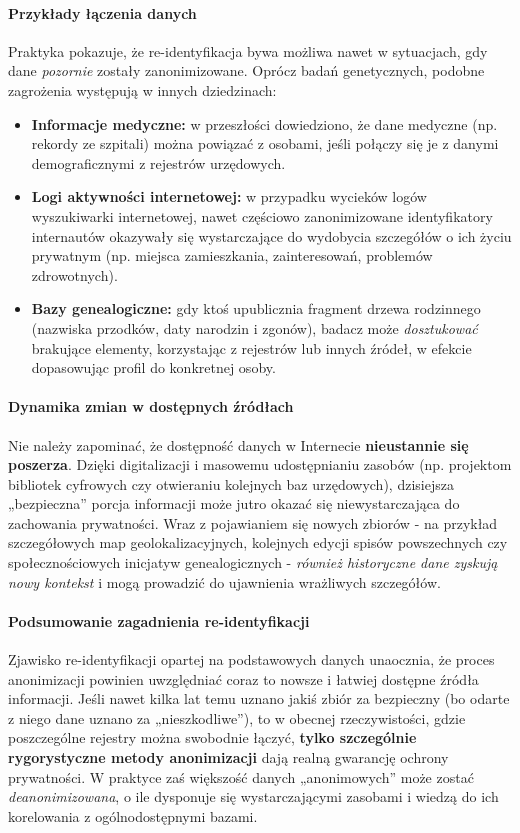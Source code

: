\paragraph{Przykłady łączenia danych}
Praktyka pokazuje, że re-identyfikacja bywa możliwa nawet w sytuacjach, gdy dane \emph{pozornie} zostały zanonimizowane. Oprócz badań genetycznych, podobne zagrożenia występują w innych dziedzinach:
\begin{itemize}
    \item \textbf{Informacje medyczne:} w przeszłości dowiedziono, że dane medyczne (np. rekordy ze szpitali) można powiązać z osobami, jeśli połączy się je z danymi demograficznymi z rejestrów urzędowych.
    \item \textbf{Logi aktywności internetowej:} w przypadku wycieków logów wyszukiwarki internetowej, nawet częściowo zanonimizowane identyfikatory internautów okazywały się wystarczające do wydobycia szczegółów o ich życiu prywatnym (np. miejsca zamieszkania, zainteresowań, problemów zdrowotnych).
    \item \textbf{Bazy genealogiczne:} gdy ktoś upublicznia fragment drzewa rodzinnego (nazwiska przodków, daty narodzin i zgonów), badacz może \emph{dosztukować} brakujące elementy, korzystając z rejestrów lub innych źródeł, w efekcie dopasowując profil do konkretnej osoby.
\end{itemize}

\paragraph{Dynamika zmian w dostępnych źródłach}
Nie należy zapominać, że dostępność danych w Internecie \textbf{nieustannie się poszerza}. Dzięki digitalizacji i masowemu udostępnianiu zasobów (np. projektom bibliotek cyfrowych czy otwieraniu kolejnych baz urzędowych), dzisiejsza „bezpieczna” porcja informacji może jutro okazać się niewystarczająca do zachowania prywatności. Wraz z pojawianiem się nowych zbiorów - na przykład szczegółowych map geolokalizacyjnych, kolejnych edycji spisów powszechnych czy społecznościowych inicjatyw genealogicznych - \emph{również historyczne dane zyskują nowy kontekst} i mogą prowadzić do ujawnienia wrażliwych szczegółów.

\paragraph{Podsumowanie zagadnienia re-identyfikacji}
Zjawisko re-identyfikacji opartej na podstawowych danych unaocznia, że proces anonimizacji powinien uwzględniać coraz to nowsze i łatwiej dostępne źródła informacji. Jeśli nawet kilka lat temu uznano jakiś zbiór za bezpieczny (bo odarte z niego dane uznano za „nieszkodliwe”), to w obecnej rzeczywistości, gdzie poszczególne rejestry można swobodnie łączyć, \textbf{tylko szczególnie rygorystyczne metody anonimizacji} dają realną gwarancję ochrony prywatności. W praktyce zaś większość danych „anonimowych” może zostać \emph{deanonimizowana}, o ile dysponuje się wystarczającymi zasobami i wiedzą do ich korelowania z ogólnodostępnymi bazami.

